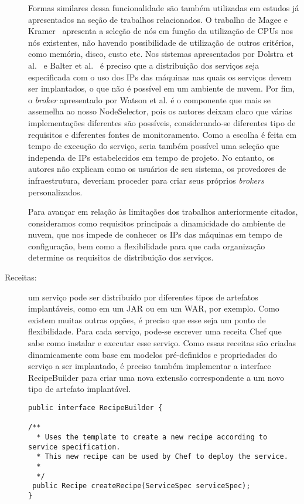 \begin{description}
Formas similares dessa funcionalidade são também utilizadas em estudos já apresentados na seção de trabalhos relacionados.  O trabalho de Magee e Kramer~\cite{Magee1997Corba} apresenta a seleção de nós em função da utilização de CPUs nos nós existentes, não havendo possibilidade de utilização de outros critérios, como memória, disco, custo etc. Nos sistemas apresentados por Dolstra et al.~\cite{Dolstra2005Configuration} e Balter et al.~\cite{Balter1998Olan} é preciso que a distribuição dos serviços seja especificada com o uso dos IPs das máquinas nas quais os serviços devem ser implantados, o que não é possível em um ambiente de nuvem. Por fim, o \emph{broker} apresentado por Watson et al. é o componente que mais se assemelha ao nosso NodeSelector, pois os autores deixam claro que várias implementações diferentes são possíveis, considerando-se diferentes tipo de requisitos e diferentes fontes de monitoramento. Como a escolha é feita em tempo de execução do serviço, seria também possível uma seleção que independa de IPs estabelecidos em tempo de projeto. No entanto, os autores não explicam como os usuários de seu sistema, os provedores de infraestrutura, deveriam proceder para criar seus próprios \emph{brokers} personalizados.

Para avançar em relação às limitações dos trabalhos anteriormente citados,  consideramos como requisitos principais a dinamicidade do ambiente de nuvem, que nos impede de conhecer os IPs das máquinas em tempo de configuração, bem como a flexibilidade para que cada organização determine os requisitos de distribuição dos serviços.

\item [Receitas:] um serviço pode ser distribuído por diferentes tipos de artefatos implantáveis, como em um JAR ou em um WAR, por exemplo. Como existem muitas outras opções, é preciso que esse seja um ponto de flexibilidade. Para cada serviço, pode-se escrever uma receita Chef que sabe como instalar e executar esse serviço. Como essas receitas são criadas dinamicamente com base em modelos pré-definidos e propriedades do serviço a ser implantado, é preciso também implementar a interface \textsf{RecipeBuilder} para criar uma nova extensão correspondente a um novo tipo de artefato implantável.

\begin{lstlisting}[frame=trbl, label=lst:recipe_builder, caption=Interface RecipeBuilder]
public interface RecipeBuilder {

/**
  * Uses the template to create a new recipe according to service specification.
  * This new recipe can be used by Chef to deploy the service.
  * 
  */	
 public Recipe createRecipe(ServiceSpec serviceSpec);
}
\end{lstlisting}


\end{description}
